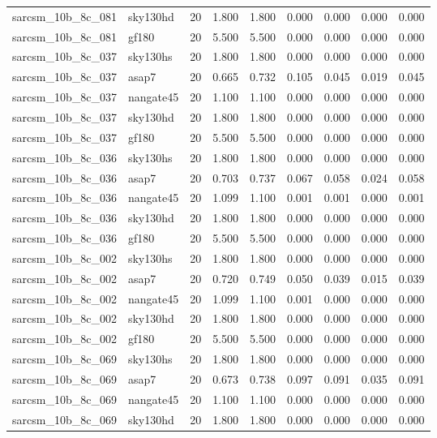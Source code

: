 \begin{tabular}{llrrrrrrr}
sarcsm\_10b\_8c\_081 & sky130hd & 20 & 1.800 & 1.800 & 0.000 & 0.000 & 0.000 & 0.000 \\
sarcsm\_10b\_8c\_081 & gf180 & 20 & 5.500 & 5.500 & 0.000 & 0.000 & 0.000 & 0.000 \\
sarcsm\_10b\_8c\_037 & sky130hs & 20 & 1.800 & 1.800 & 0.000 & 0.000 & 0.000 & 0.000 \\
sarcsm\_10b\_8c\_037 & asap7 & 20 & 0.665 & 0.732 & 0.105 & 0.045 & 0.019 & 0.045 \\
sarcsm\_10b\_8c\_037 & nangate45 & 20 & 1.100 & 1.100 & 0.000 & 0.000 & 0.000 & 0.000 \\
sarcsm\_10b\_8c\_037 & sky130hd & 20 & 1.800 & 1.800 & 0.000 & 0.000 & 0.000 & 0.000 \\
sarcsm\_10b\_8c\_037 & gf180 & 20 & 5.500 & 5.500 & 0.000 & 0.000 & 0.000 & 0.000 \\
sarcsm\_10b\_8c\_036 & sky130hs & 20 & 1.800 & 1.800 & 0.000 & 0.000 & 0.000 & 0.000 \\
sarcsm\_10b\_8c\_036 & asap7 & 20 & 0.703 & 0.737 & 0.067 & 0.058 & 0.024 & 0.058 \\
sarcsm\_10b\_8c\_036 & nangate45 & 20 & 1.099 & 1.100 & 0.001 & 0.001 & 0.000 & 0.001 \\
sarcsm\_10b\_8c\_036 & sky130hd & 20 & 1.800 & 1.800 & 0.000 & 0.000 & 0.000 & 0.000 \\
sarcsm\_10b\_8c\_036 & gf180 & 20 & 5.500 & 5.500 & 0.000 & 0.000 & 0.000 & 0.000 \\
sarcsm\_10b\_8c\_002 & sky130hs & 20 & 1.800 & 1.800 & 0.000 & 0.000 & 0.000 & 0.000 \\
sarcsm\_10b\_8c\_002 & asap7 & 20 & 0.720 & 0.749 & 0.050 & 0.039 & 0.015 & 0.039 \\
sarcsm\_10b\_8c\_002 & nangate45 & 20 & 1.099 & 1.100 & 0.001 & 0.000 & 0.000 & 0.000 \\
sarcsm\_10b\_8c\_002 & sky130hd & 20 & 1.800 & 1.800 & 0.000 & 0.000 & 0.000 & 0.000 \\
sarcsm\_10b\_8c\_002 & gf180 & 20 & 5.500 & 5.500 & 0.000 & 0.000 & 0.000 & 0.000 \\
sarcsm\_10b\_8c\_069 & sky130hs & 20 & 1.800 & 1.800 & 0.000 & 0.000 & 0.000 & 0.000 \\
sarcsm\_10b\_8c\_069 & asap7 & 20 & 0.673 & 0.738 & 0.097 & 0.091 & 0.035 & 0.091 \\
sarcsm\_10b\_8c\_069 & nangate45 & 20 & 1.100 & 1.100 & 0.000 & 0.000 & 0.000 & 0.000 \\
sarcsm\_10b\_8c\_069 & sky130hd & 20 & 1.800 & 1.800 & 0.000 & 0.000 & 0.000 & 0.000 \\

\end{tabular}
